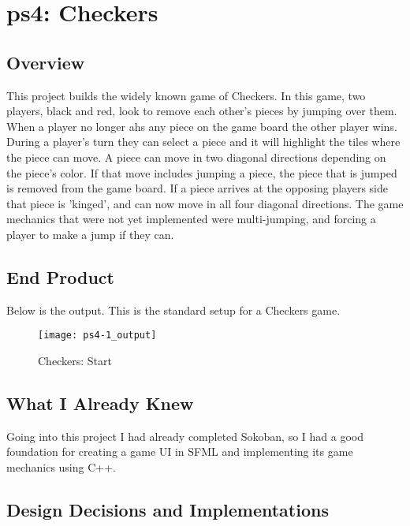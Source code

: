 \section{ps4: Checkers}\label{sec:ps4}

\subsection{Overview}\label{sec:ps4:overview} %

This project builds the widely known game of Checkers.
In this game, two players, black and red, look to remove each other's pieces by jumping over them.
When a player no longer ahs any piece on the game board the other player wins. 
During a player's turn they can select a piece and it will highlight the tiles where the piece can move.
A piece can move in two diagonal directions depending on the piece's color.
If that move includes jumping a piece, the piece that is jumped is removed from the game board.
If a piece arrives at the opposing players side that piece is 'kinged', and can now move in all four diagonal directions. 
The game mechanics that were not yet implemented were multi-jumping, and forcing a player to make a jump if they can.

\subsection{End Product}\label{sec:ps4:accomplish} %

Below is the output.
This is the standard setup for a Checkers game.

\begin{figure}[h]
\centering
\begin{minipage}[b]{0.4\textwidth}
\texttt{[image: ps4-1\_output]}
\caption{Checkers: Start}
\end{minipage}
\end{figure}

\subsection{What I Already Knew}\label{sec:ps4:knew} %

Going into this project I had already completed Sokoban, so I had a good foundation for creating a game UI in SFML and implementing its game mechanics using C++.

\subsection{Design Decisions and Implementations}\label{sec:ps4:decisions} %

